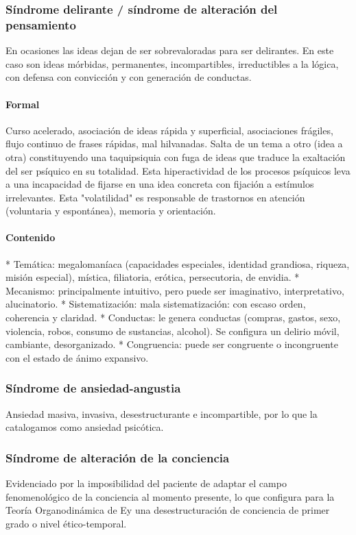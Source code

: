 \subsubsection*{Síndrome delirante / síndrome de alteración del pensamiento}
En ocasiones las ideas dejan de ser sobrevaloradas para ser delirantes. En este caso son ideas mórbidas, permanentes, incompartibles, irreductibles a la lógica, con defensa con convicción y con generación de conductas.
\paragraph{Formal}
Curso acelerado, asociación de ideas rápida y superficial, asociaciones frágiles, flujo continuo de frases rápidas, mal hilvanadas. Salta de un tema a otro (idea a otra) constituyendo una taquipsiquia con fuga de ideas que traduce la exaltación del ser psíquico en su totalidad. Esta hiperactividad de los procesos psíquicos leva a una incapacidad de fijarse en una idea concreta con fijación a estímulos irrelevantes. Esta "volatilidad" es responsable de trastornos en atención (voluntaria y espontánea), memoria y orientación.
\paragraph{Contenido}
* Temática: megalomaníaca (capacidades especiales, identidad grandiosa, riqueza, misión especial), mística, filiatoria, erótica, persecutoria, de envidia.
* Mecanismo: principalmente intuitivo, pero puede ser imaginativo, interpretativo, alucinatorio.
* Sistematización: mala sistematización: con escaso orden, coherencia y claridad.
* Conductas: le genera conductas (compras, gastos, sexo, violencia, robos, consumo de sustancias, alcohol). Se configura un delirio móvil, cambiante, desorganizado.
* Congruencia: puede ser congruente o incongruente con el estado de ánimo expansivo.
\subsubsection*{Síndrome de ansiedad-angustia}
Ansiedad masiva, invasiva, desestructurante e incompartible, por lo que la catalogamos como ansiedad psicótica.
\subsubsection*{Síndrome de alteración de la conciencia}
Evidenciado por la imposibilidad del paciente de adaptar el campo fenomenológico de la conciencia al momento presente, lo que configura para la Teoría Organodinámica de Ey una desestructuración de conciencia de primer grado o nivel ético-temporal.

